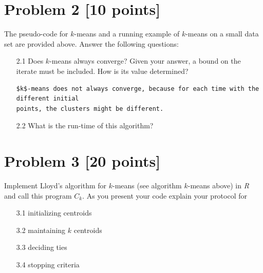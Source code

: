 \documentclass{article}
\begin{document}
\begin{enumerate}
\begin{enumerate}
\end{enumerate}
\end{enumerate}

\pagebreak

\section*{Problem 2 [10 points]} 

The pseudo-code for $k$-means and a running example of $k$-means on a small data set are provided above. Answer the following questions:

\begin{enumerate}
  \item[2.1] Does $k$-means always converge? Given your answer, a bound on the iterate must be included. How is
its value determined?
\begin{verbatim}
$k$-means does not always converge, because for each time with the different initial 
points, the clusters might be different.
\end{verbatim}
  \item[2.2] What is the run-time of this algorithm?
\end{enumerate}

\pagebreak



\section*{Problem 3 [20 points]} 

 Implement Lloyd's algorithm for $k$-means (see algorithm $k$-means above)  in \textit{R} and call this program $C_k$. As you present your code explain your protocol for


\begin{enumerate}
  \item[3.1] initializing centroids
  \item[3.2] maintaining $k$ centroids
  \item[3.3]  deciding ties
  \item[3.4] stopping criteria
\end{enumerate}
\end{document}
